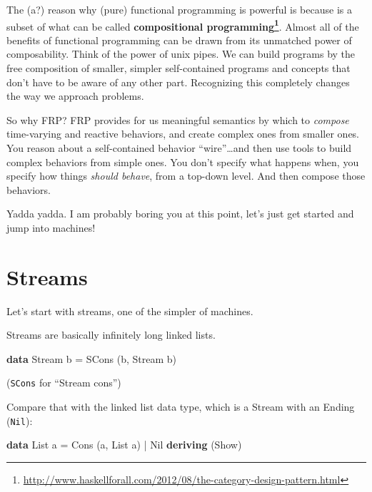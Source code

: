 \documentclass[]{article}
\newenvironment{Shaded}{}{}
\newcommand{\KeywordTok}[1]{\textcolor[rgb]{0.00,0.44,0.13}{\textbf{{#1}}}}
\newcommand{\DataTypeTok}[1]{\textcolor[rgb]{0.56,0.13,0.00}{{#1}}}
\newcommand{\FunctionTok}[1]{\textcolor[rgb]{0.02,0.16,0.49}{{#1}}}
\newcommand{\NormalTok}[1]{{#1}}
\renewcommand{\href}[2]{#2\footnote{\url{#1}}}
\begin{document}
The (a?) reason why (pure) functional programming is powerful is because
is a subset of what can be called
\textbf{\href{http://www.haskellforall.com/2012/08/the-category-design-pattern.html}{compositional
programming}}. Almost all of the benefits of functional programming can
be drawn from its unmatched power of composability. Think of the power
of unix pipes. We can build programs by the free composition of smaller,
simpler self-contained programs and concepts that don't have to be aware
of any other part. Recognizing this completely changes the way we
approach problems.

So why FRP? FRP provides for us meaningful semantics by which to
\emph{compose} time-varying and reactive behaviors, and create complex
ones from smaller ones. You reason about a self-contained behavior
``wire''\ldots{}and then use tools to build complex behaviors from
simple ones. You don't specify what happens when, you specify how things
\emph{should behave}, from a top-down level. And then compose those
behaviors.

Yadda yadda. I am probably boring you at this point, let's just get
started and jump into machines!

\section{Streams}\label{streams}

Let's start with streams, one of the simpler of machines.

Streams are basically infinitely long linked lists.

\begin{Shaded}
\begin{Highlighting}[]
\KeywordTok{data} \DataTypeTok{Stream} \NormalTok{b }\FunctionTok{=} \DataTypeTok{SCons} \NormalTok{(b, }\DataTypeTok{Stream} \NormalTok{b)}
\end{Highlighting}
\end{Shaded}

(\texttt{SCons} for ``Stream cons'')

Compare that with the linked list data type, which is a Stream with an
Ending (\texttt{Nil}):

\begin{Shaded}
\begin{Highlighting}[]
\KeywordTok{data} \DataTypeTok{List} \NormalTok{a }\FunctionTok{=} \DataTypeTok{Cons} \NormalTok{(a, }\DataTypeTok{List} \NormalTok{a) }\FunctionTok{|} \DataTypeTok{Nil}
  \KeywordTok{deriving} \NormalTok{(}\DataTypeTok{Show}\NormalTok{)}
\end{Highlighting}
\end{Shaded}
\end{document}
